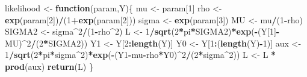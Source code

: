 \documentclass[
  12pt,
]{book}
\newenvironment{Shaded}{\begin{snugshade}}{\end{snugshade}}
\newcommand{\ControlFlowTok}[1]{\textcolor[rgb]{0.13,0.29,0.53}{\textbf{#1}}}
\newcommand{\DecValTok}[1]{\textcolor[rgb]{0.00,0.00,0.81}{#1}}
\newcommand{\FunctionTok}[1]{\textcolor[rgb]{0.13,0.29,0.53}{\textbf{#1}}}
\newcommand{\NormalTok}[1]{#1}
\newcommand{\OtherTok}[1]{\textcolor[rgb]{0.56,0.35,0.01}{#1}}
\newcommand{\SpecialCharTok}[1]{\textcolor[rgb]{0.81,0.36,0.00}{\textbf{#1}}}
\theoremstyle{definition}
\theoremstyle{definition}
\theoremstyle{definition}
\theoremstyle{definition}
\theoremstyle{remark}
\begin{document}
\begin{Shaded}
\begin{Highlighting}[]
\NormalTok{likelihood }\OtherTok{\textless{}{-}} \ControlFlowTok{function}\NormalTok{(param,Y)\{}
\NormalTok{  mu  }\OtherTok{\textless{}{-}}\NormalTok{ param[}\DecValTok{1}\NormalTok{]}
\NormalTok{  rho }\OtherTok{\textless{}{-}} \FunctionTok{exp}\NormalTok{(param[}\DecValTok{2}\NormalTok{])}\SpecialCharTok{/}\NormalTok{(}\DecValTok{1}\SpecialCharTok{+}\FunctionTok{exp}\NormalTok{(param[}\DecValTok{2}\NormalTok{]))}
\NormalTok{  sigma }\OtherTok{\textless{}{-}} \FunctionTok{exp}\NormalTok{(param[}\DecValTok{3}\NormalTok{])}
\NormalTok{  MU }\OtherTok{\textless{}{-}}\NormalTok{ mu}\SpecialCharTok{/}\NormalTok{(}\DecValTok{1}\SpecialCharTok{{-}}\NormalTok{rho)}
\NormalTok{  SIGMA2 }\OtherTok{\textless{}{-}}\NormalTok{ sigma}\SpecialCharTok{\^{}}\DecValTok{2}\SpecialCharTok{/}\NormalTok{(}\DecValTok{1}\SpecialCharTok{{-}}\NormalTok{rho}\SpecialCharTok{\^{}}\DecValTok{2}\NormalTok{)}
\NormalTok{  L }\OtherTok{\textless{}{-}} \DecValTok{1}\SpecialCharTok{/}\FunctionTok{sqrt}\NormalTok{(}\DecValTok{2}\SpecialCharTok{*}\NormalTok{pi}\SpecialCharTok{*}\NormalTok{SIGMA2)}\SpecialCharTok{*}\FunctionTok{exp}\NormalTok{(}\SpecialCharTok{{-}}\NormalTok{(Y[}\DecValTok{1}\NormalTok{]}\SpecialCharTok{{-}}\NormalTok{MU)}\SpecialCharTok{\^{}}\DecValTok{2}\SpecialCharTok{/}\NormalTok{(}\DecValTok{2}\SpecialCharTok{*}\NormalTok{SIGMA2))}
\NormalTok{  Y1 }\OtherTok{\textless{}{-}}\NormalTok{ Y[}\DecValTok{2}\SpecialCharTok{:}\FunctionTok{length}\NormalTok{(Y)]}
\NormalTok{  Y0 }\OtherTok{\textless{}{-}}\NormalTok{ Y[}\DecValTok{1}\SpecialCharTok{:}\NormalTok{(}\FunctionTok{length}\NormalTok{(Y)}\SpecialCharTok{{-}}\DecValTok{1}\NormalTok{)]}
\NormalTok{  aux }\OtherTok{\textless{}{-}} \DecValTok{1}\SpecialCharTok{/}\FunctionTok{sqrt}\NormalTok{(}\DecValTok{2}\SpecialCharTok{*}\NormalTok{pi}\SpecialCharTok{*}\NormalTok{sigma}\SpecialCharTok{\^{}}\DecValTok{2}\NormalTok{)}\SpecialCharTok{*}\FunctionTok{exp}\NormalTok{(}\SpecialCharTok{{-}}\NormalTok{(Y1}\SpecialCharTok{{-}}\NormalTok{mu}\SpecialCharTok{{-}}\NormalTok{rho}\SpecialCharTok{*}\NormalTok{Y0)}\SpecialCharTok{\^{}}\DecValTok{2}\SpecialCharTok{/}\NormalTok{(}\DecValTok{2}\SpecialCharTok{*}\NormalTok{sigma}\SpecialCharTok{\^{}}\DecValTok{2}\NormalTok{))}
\NormalTok{  L }\OtherTok{\textless{}{-}}\NormalTok{ L }\SpecialCharTok{*} \FunctionTok{prod}\NormalTok{(aux)}
  \FunctionTok{return}\NormalTok{(L)}
\NormalTok{\}}
\end{Highlighting}
\end{Shaded}
\end{document}
